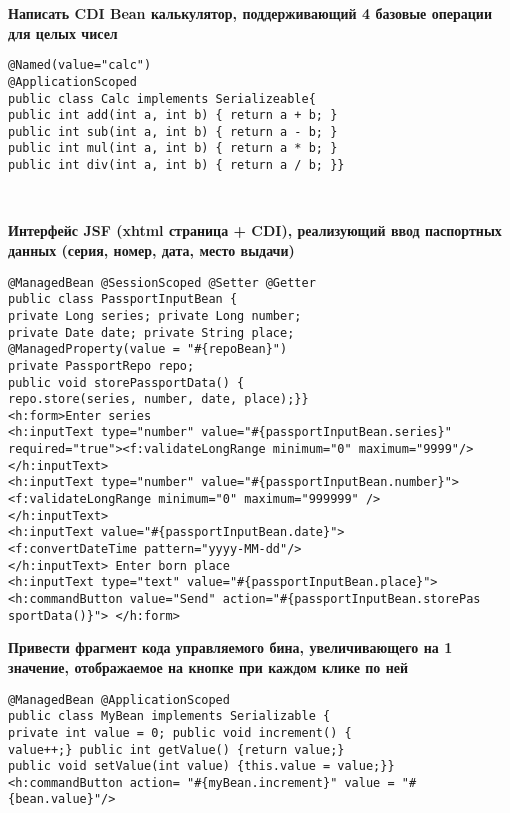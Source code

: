 \documentclass{article}
\begin{document}
\hfill
\begin{minipage}[t]{0.3\textwidth}
    \textbf{Написать CDI Bean калькулятор, поддерживающий 4 базовые операции для целых чисел}
    \begin{lstlisting}[frame=single, basicstyle=\tiny\ttfamily, breaklines=true, breakatwhitespace=true, postbreak=\mbox{\textcolor{red}{$\hookrightarrow$}\space}]
@Named(value="calc")
@ApplicationScoped
public class Calc implements Serializeable{
public int add(int a, int b) { return a + b; }
public int sub(int a, int b) { return a - b; }
public int mul(int a, int b) { return a * b; }
public int div(int a, int b) { return a / b; }}
    \end{lstlisting}
\end{minipage}%
\\

\begin{minipage}[t]{0.3\textwidth}
    \textbf{Интерфейс JSF (xhtml страница + CDI), реализующий ввод паспортных данных (серия, номер, дата, место выдачи)}
    \begin{lstlisting}[frame=single, basicstyle=\tiny\ttfamily, breaklines=true, breakatwhitespace=true, postbreak=\mbox{\textcolor{red}{$\hookrightarrow$}\space}]
@ManagedBean @SessionScoped @Setter @Getter 
public class PassportInputBean { 	
private Long series; private Long number; 	
private Date date; private String place; 	
@ManagedProperty(value = "#{repoBean}") 
private PassportRepo repo; 	
public void storePassportData() { 		
repo.store(series, number, date, place);}}
<h:form>Enter series	
<h:inputText type="number" value="#{passportInputBean.series}"
required="true"><f:validateLongRange minimum="0" maximum="9999"/>	
</h:inputText>
<h:inputText type="number" value="#{passportInputBean.number}"> 
<f:validateLongRange minimum="0" maximum="999999" />
</h:inputText>
<h:inputText value="#{passportInputBean.date}">
<f:convertDateTime pattern="yyyy-MM-dd"/> 	
</h:inputText> Enter born place 	
<h:inputText type="text" value="#{passportInputBean.place}">
<h:commandButton value="Send" action="#{passportInputBean.storePas
sportData()}"> </h:form>
    \end{lstlisting}
\end{minipage}%
\hfill
\begin{minipage}[t]{0.3\textwidth}
    \textbf{Привести фрагмент кода управляемого бина, увеличивающего на 1 значение, отображаемое на кнопке при каждом клике по ней}
    \begin{lstlisting}[frame=single, basicstyle=\tiny\ttfamily, breaklines=true, breakatwhitespace=true, postbreak=\mbox{\textcolor{red}{$\hookrightarrow$}\space}]
@ManagedBean @ApplicationScoped
public class MyBean implements Serializable {
private int value = 0; public void increment() {
value++;} public int getValue() {return value;}
public void setValue(int value) {this.value = value;}}
<h:commandButton action= "#{myBean.increment}" value = "#{bean.value}"/>
    \end{lstlisting}
\end{minipage}%
\end{document}
